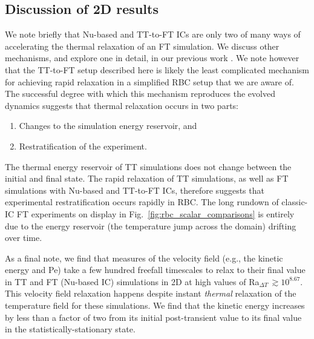 \documentclass[aps, pre, onecolumn, nofootinbib, notitlepage, groupedaddress, amsfonts, amssymb, amsmath, longbibliography, superscriptaddress]{revtex4-1}
\begin{document}
\subsection{Discussion of 2D results} 
We note briefly that Nu-based and TT-to-FT ICs are only two of many ways of accelerating the thermal relaxation of an FT simulation.
We discuss other mechanisms, and explore one in detail, in our previous work \cite{anders&all2018}.
We note however that the TT-to-FT setup described here is likely the least complicated mechanism for achieving rapid relaxation in a simplified RBC setup that we are aware of.
The successful degree with which this mechanism reproduces the evolved dynamics suggests that thermal relaxation occurs in two parts:
\begin{enumerate}
\item Changes to the simulation energy reservoir, and
\item Restratification of the experiment.
\end{enumerate}
The thermal energy reservoir of TT simulations does not change between the initial and final state.
The rapid relaxation of TT simulations, as well as FT simulations with Nu-based and TT-to-FT ICs, therefore suggests that experimental restratification occurs rapidly in RBC. 
The long rundown of classic-IC FT experiments on display in Fig.~\ref{fig:rbc_scalar_comparisons} is entirely due to the energy reservoir (the temperature jump across the domain) drifting over time.

As a final note, we find that measures of the velocity field (e.g., the kinetic energy and Pe) take a few hundred freefall timescales to relax to their final value in TT and FT (Nu-based IC) simulations in 2D at high values of Ra$_{\Delta T}\,\gtrsim 10^{8.67}$.
This velocity field relaxation happens despite instant \emph{thermal} relaxation of the temperature field for these simulations.
We find that the kinetic energy increases by less than a factor of two from its initial post-transient value to its final value in the statistically-stationary state.
\end{document}
